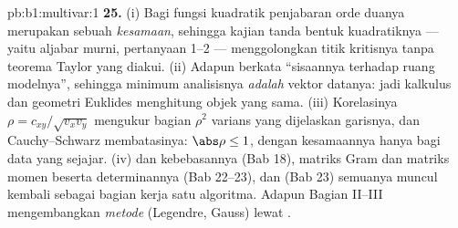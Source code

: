 \begin{solution}{pb:b1:multivar:1}
\textbf{25.} (i) Bagi fungsi kuadratik penjabaran orde duanya
merupakan sebuah \emph{kesamaan}, sehingga kajian tanda bentuk kuadratiknya
--- yaitu aljabar murni, pertanyaan 1--2 --- menggolongkan titik kritisnya
tanpa teorema Taylor yang diakui. (ii) Adapun  berkata
``sisaannya  terhadap ruang modelnya'', sehingga minimum
analisisnya \emph{adalah}  vektor datanya:
jadi kalkulus dan geometri Euklides menghitung objek yang sama. (iii)
Korelasinya $\rho = c_{xy}/\sqrt{v_xv_y}$ mengukur bagian
$\rho^2$ varians yang dijelaskan garisnya, dan
Cauchy--Schwarz membatasinya: $\abs\rho \leq 1$, dengan kesamaannya hanya
bagi data yang sejajar. (iv)  dan kebebasannya (Bab 18), matriks Gram
dan matriks momen beserta determinannya (Bab 22--23),
dan  (Bab 23) semuanya muncul kembali sebagai
bagian kerja satu algoritma. Adapun Bagian II--III mengembangkan
\emph{metode } (Legendre, Gauss) lewat
\emph{}.

\end{solution}
